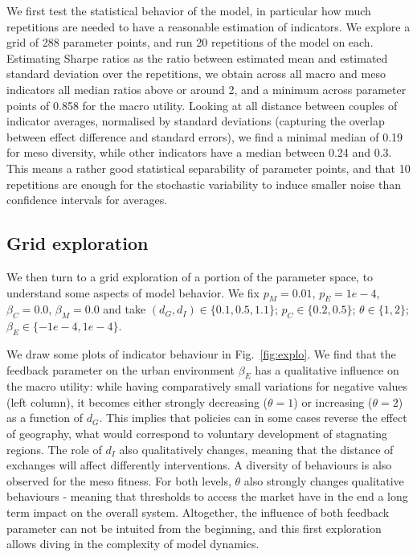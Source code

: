 \documentclass[letterpaper]{article}
\begin{document}

We first test the statistical behavior of the model, in particular how much repetitions are needed to have a reasonable estimation of indicators. We explore a grid of 288 parameter points, and run 20 repetitions of the model on each. Estimating Sharpe ratios as the ratio between estimated mean and estimated standard deviation over the repetitions, we obtain across all macro and meso indicators all median ratios above or around 2, and a minimum across parameter points of 0.858 for the macro utility. Looking at all distance between couples of indicator averages, normalised by standard deviations (capturing the overlap between effect difference and standard errors), we find a minimal median of 0.19 for meso diversity, while other indicators have a median between 0.24 and 0.3. This means a rather good statistical separability of parameter points, and that 10 repetitions are enough for the stochastic variability to induce smaller noise than confidence intervals for averages.

\subsection{Grid exploration}


We then turn to a grid exploration of a portion of the parameter space, to understand some aspects of model behavior. We fix $p_M = 0.01$, $p_E=1e-4$, $\beta_C=0.0$, $\beta_M=0.0$ and take $(d_G,d_I)\in \{0.1,0.5,1.1\}$; $p_C \in \{0.2, 0.5\}$; $\theta \in \{1 , 2\}$; $\beta_E \in \{-1e-4 , 1e-4\}$.



We draw some plots of indicator behaviour in Fig.~\ref{fig:explo}. We find that the feedback parameter on the urban environment $\beta_E$ has a qualitative influence on the macro utility: while having comparatively small variations for negative values (left column), it becomes either strongly decreasing ($\theta=1$) or increasing ($\theta=2$) as a function of $d_G$. This implies that policies can in some cases reverse the effect of geography, what would correspond to voluntary development of stagnating regions. The role of $d_I$ also qualitatively changes, meaning that the distance of exchanges will affect differently interventions. A diversity of behaviours is also observed for the meso fitness. For both levels, $\theta$ also strongly changes qualitative behaviours - meaning that thresholds to access the market have in the end a long term impact on the overall system. Altogether, the influence of both feedback parameter can not be intuited from the beginning, and this first exploration allows diving in the complexity of model dynamics.
\end{document}
